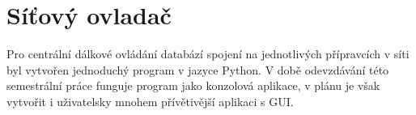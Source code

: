 \chapter{Síťový ovladač}
Pro centrální dálkové ovládání databází spojení na jednotlivých přípravcích v síti byl vytvořen jednoduchý program v jazyce Python. V době odevzdávání této semestrální práce funguje program jako konzolová aplikace, v plánu je však vytvořit i uživatelsky mnohem přívětivější aplikaci s GUI.

